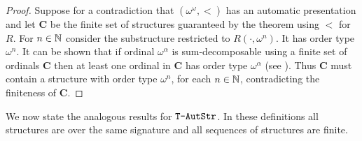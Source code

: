 \begin{proof}
Suppose for a contradiction that $(\omega^\omega,<)$ has an automatic presentation and let $\mathbf{C}$ be the finite set of structures
guaranteed by the theorem using $<$ for $R$. For $n \in \mathbb{N}$ consider the substructure restricted to $R(\cdot,\omega^n)$. It has order type $\omega^n$.
It can be shown that if ordinal $\omega^\alpha$ is sum-decomposable using a finite set of ordinals $\mathbf{C}$ then at least one ordinal in $\mathbf{C}$ has order type $\omega^\alpha$ (see \cite{Delh06}).
Thus $\mathbf{C}$ must contain a structure with order type $\omega^n$, for each $n \in \mathbb{N}$, contradicting the finiteness of $\mathbf{C}$. 
\end{proof}


We now state the analogous results for $\mbox{\tt T-AutStr}$. In these definitions all structures are over the same signature and all sequences of structures are finite.

%
%

